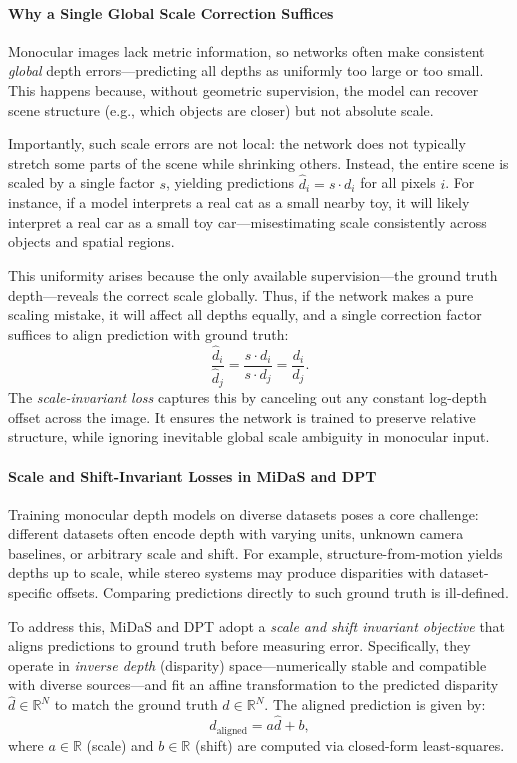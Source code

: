 \paragraph{Why a Single Global Scale Correction Suffices}

Monocular images lack metric information, so networks often make consistent \emph{global} depth errors—predicting all depths as uniformly too large or too small. This happens because, without geometric supervision, the model can recover scene structure (e.g., which objects are closer) but not absolute scale.

Importantly, such scale errors are not local: the network does not typically stretch some parts of the scene while shrinking others. Instead, the entire scene is scaled by a single factor \( s \), yielding predictions \( \hat{d}_i = s \cdot d_i \) for all pixels \( i \). For instance, if a model interprets a real cat as a small nearby toy, it will likely interpret a real car as a small toy car—misestimating scale consistently across objects and spatial regions.

This uniformity arises because the only available supervision—the ground truth depth—reveals the correct scale globally. Thus, if the network makes a pure scaling mistake, it will affect all depths equally, and a single correction factor suffices to align prediction with ground truth:
\[
\frac{\hat{d}_i}{\hat{d}_j} = \frac{s \cdot d_i}{s \cdot d_j} = \frac{d_i}{d_j}.
\]
The \emph{scale-invariant loss} captures this by canceling out any constant log-depth offset across the image. It ensures the network is trained to preserve relative structure, while ignoring inevitable global scale ambiguity in monocular input.

\paragraph{Scale and Shift-Invariant Losses in MiDaS and DPT}

Training monocular depth models on diverse datasets poses a core challenge: different datasets often encode depth with varying units, unknown camera baselines, or arbitrary scale and shift. For example, structure-from-motion yields depths up to scale, while stereo systems may produce disparities with dataset-specific offsets. Comparing predictions directly to such ground truth is ill-defined.

To address this, MiDaS \cite{ranftl2022_midas} and DPT \cite{ranftl2021_dpt} adopt a \emph{scale and shift invariant objective} that aligns predictions to ground truth before measuring error. Specifically, they operate in \emph{inverse depth} (disparity) space—numerically stable and compatible with diverse sources—and fit an affine transformation to the predicted disparity \( \hat{d} \in \mathbb{R}^N \) to match the ground truth \( d \in \mathbb{R}^N \). The aligned prediction is given by:
\[
\hat{d}_{\text{aligned}} = a \hat{d} + b,
\]
where \( a \in \mathbb{R} \) (scale) and \( b \in \mathbb{R} \) (shift) are computed via closed-form least-squares.

